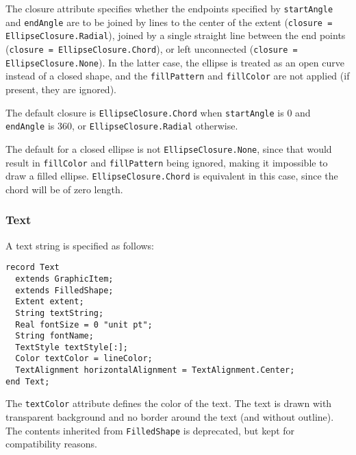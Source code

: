 The closure attribute specifies whether the endpoints specified by \lstinline!startAngle! and \lstinline!endAngle! are to be joined by lines to the center of the extent (\lstinline!closure = EllipseClosure.Radial!), joined by a single straight line between the end points (\lstinline!closure = EllipseClosure.Chord!), or left unconnected (\lstinline!closure = EllipseClosure.None!).  In the latter case, the ellipse is treated as an open curve instead of a closed shape, and the \lstinline!fillPattern! and \lstinline!fillColor! are not applied (if present, they are ignored).

The default closure is \lstinline!EllipseClosure.Chord! when \lstinline!startAngle! is 0 and \lstinline!endAngle! is 360, or \lstinline!EllipseClosure.Radial! otherwise.

\begin{nonnormative}
The default for a closed ellipse is not \lstinline!EllipseClosure.None!, since that would result in \lstinline!fillColor!
and \lstinline!fillPattern! being ignored, making it impossible to draw a filled ellipse. \lstinline!EllipseClosure.Chord!
is equivalent in this case, since the chord will be of zero length.
\end{nonnormative}

\subsubsection{Text}\label{text}

A text string is specified as follows:
\begin{lstlisting}[language=modelica]
record Text
  extends GraphicItem;
  extends FilledShape;
  Extent extent;
  String textString;
  Real fontSize = 0 "unit pt";
  String fontName;
  TextStyle textStyle[:];
  Color textColor = lineColor;
  TextAlignment horizontalAlignment = TextAlignment.Center;
end Text;
\end{lstlisting}%
The \lstinline!textColor! attribute defines the color of the text.
The text is drawn with transparent background and no border around the text (and without outline).
The contents inherited from \lstinline!FilledShape! is deprecated, but kept for compatibility reasons.


